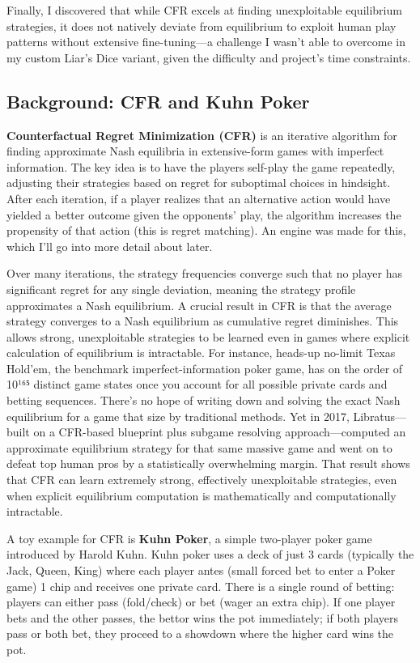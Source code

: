 \documentclass[
]{article}
\begin{document}
Finally, I discovered that while CFR excels at finding unexploitable
equilibrium strategies, it does not natively deviate from equilibrium to
exploit human play patterns without extensive fine-tuning---a challenge
I wasn't able to overcome in my custom Liar's Dice variant, given the
difficulty and project's time constraints.

\subsection{\texorpdfstring{\textbf{Background: CFR and Kuhn
Poker}}{Background: CFR and Kuhn Poker}}\label{background-cfr-and-kuhn-poker}

\textbf{Counterfactual Regret Minimization (CFR)} is an iterative
algorithm for finding approximate Nash equilibria in extensive-form
games with imperfect information. The key idea is to have the players
self-play the game repeatedly, adjusting their strategies based on
regret for suboptimal choices in hindsight. After each iteration, if a
player realizes that an alternative action would have yielded a better
outcome given the opponents' play, the algorithm increases the
propensity of that action (this is regret matching). An engine was made
for this, which I'll go into more detail about later.

Over many iterations, the strategy frequencies converge such that no
player has significant regret for any single deviation, meaning the
strategy profile approximates a Nash equilibrium. A crucial result in
CFR is that the average strategy converges to a Nash equilibrium as
cumulative regret diminishes. This allows strong, unexploitable
strategies to be learned even in games where explicit calculation of
equilibrium is intractable. For instance, heads-up no-limit Texas
Hold'em, the benchmark imperfect-information poker game, has on the
order of 10¹⁶⁵ distinct game states once you account for all possible
private cards and betting sequences. There's no hope of writing down and
solving the exact Nash equilibrium for a game that size by traditional
methods. Yet in 2017, Libratus---built on a CFR-based blueprint plus
subgame resolving approach---computed an approximate equilibrium
strategy for that same massive game and went on to defeat top human pros
by a statistically overwhelming margin. That result shows that CFR can
learn extremely strong, effectively unexploitable strategies, even when
explicit equilibrium computation is mathematically and computationally
intractable.

A toy example for CFR is \textbf{Kuhn Poker}, a simple two-player poker
game introduced by Harold Kuhn. Kuhn poker uses a deck of just 3 cards
(typically the Jack, Queen, King) where each player antes (small forced
bet to enter a Poker game) 1 chip and receives one private card. There
is a single round of betting: players can either pass (fold/check) or
bet (wager an extra chip). If one player bets and the other passes, the
bettor wins the pot immediately; if both players pass or both bet, they
proceed to a showdown where the higher card wins the pot.
\end{document}

